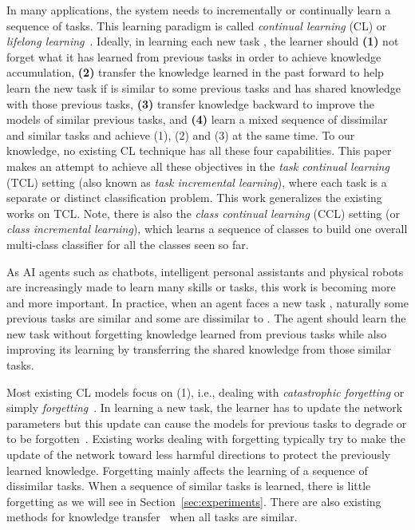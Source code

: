 \documentclass{article}
\begin{document}
In many applications, the system needs to incrementally or continually learn a sequence of tasks. This learning paradigm is called \textit{continual learning} (CL) or \textit{lifelong learning}~\citep{chen2018lifelong}. Ideally, in learning each new task , the learner should 
\textbf{(1)} not forget what it has learned from previous tasks in order to achieve knowledge accumulation, 
\textbf{(2)} transfer the knowledge learned in the past forward to help learn the new task  if  is similar to some previous tasks and has shared knowledge with those previous tasks, 
\textbf{(3)} transfer knowledge backward to improve the models of similar previous tasks, and 
\textbf{(4)} learn a mixed sequence of dissimilar and similar tasks and achieve (1), (2) and (3) at the same time. To our knowledge, no existing CL technique has all these four capabilities. This paper makes an attempt to achieve all these objectives in the \textit{task continual learning} (TCL) setting (also known as \textit{task incremental learning}), where each task is a separate or distinct classification problem. This work generalizes the existing works on TCL. Note, there is also the \textit{class continual learning} (CCL) setting (or \textit{class incremental learning}), which learns a sequence of classes to build one overall multi-class classifier for all the classes seen so far.

As AI agents such as chatbots, intelligent personal assistants and physical robots are increasingly made to learn many skills or tasks, this work is becoming more and more important. In practice, when an agent faces a new task , naturally some previous tasks are similar and some are dissimilar to . The agent should learn the new task without forgetting knowledge learned from previous tasks while also improving its learning by transferring the shared knowledge from those similar tasks. 


Most existing CL models focus on (1), i.e., dealing with \textit{catastrophic forgetting} or simply \textit{forgetting}~\citep{chen2018lifelong,Parisi2018continual,Li2016LwF,Seff2017continual,Shin2017continual,Kirkpatrick2017overcoming,Rebuffi2017,yoon2018lifelong,He2018overcoming,yoon2018lifelong,Masse2018alleviating,schwarz2018progress,Nguyen2018variational,hu2019overcoming}. 
In learning a new task, the learner has to update the network parameters but this update can cause the models for previous tasks to degrade or to be forgotten~\citep{mccloskey1989catastrophic}. Existing works dealing with forgetting typically try to make the update of the network toward less harmful directions to protect the previously learned knowledge. Forgetting mainly affects the learning of a sequence of dissimilar tasks. When a sequence of similar tasks is learned, there is little forgetting as we will see in Section~\ref{sec:experiments}. There are also existing methods for knowledge transfer~\citep{ruvolo2013ella,chen2014topic,chen2015lifelong,hao2019forward,ke2020continual} when all tasks are similar. 
\end{document}
